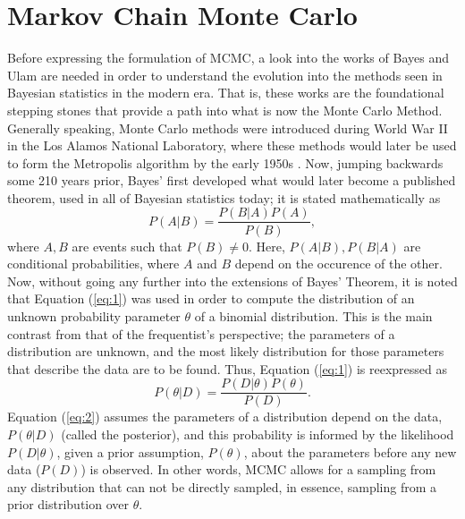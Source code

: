 \documentclass[11pt]{article}
\theoremstyle{definition}
\begin{document}
\section{Markov Chain Monte Carlo}
Before expressing the formulation of MCMC, a look into the works of Bayes and Ulam are needed in order to understand the evolution into the methods seen in Bayesian statistics in the modern era. That is, these works are the foundational stepping stones that provide a path into what is now the Monte Carlo Method. Generally speaking, Monte Carlo methods were introduced during World War II in the Los Alamos National Laboratory, where these methods would later be used to form the Metropolis algorithm by the early 1950s \cite{Robert_2011}. Now, jumping backwards some 210 years prior, Bayes' first developed what would later become a published theorem, used in all of Bayesian statistics today; it is stated mathematically as 
\begin{equation}\label{eq:1}
    P(A|B)=\frac{P(B|A)P(A)}{P(B)},
\end{equation}
where $A,B$ are events such that $P(B)\neq 0$. Here, $P(A|B),P(B|A)$ are conditional probabilities, where $A$ and $B$ depend on the occurence of the other. Now, without going any further into the extensions of Bayes' Theorem, it is noted that Equation (\ref{eq:1}) was used in order to compute the distribution of an unknown probability parameter $\theta$ of a binomial distribution. This is the main contrast from that of the frequentist's perspective; the parameters of a distribution are unknown, and the most likely distribution for those parameters that describe the data are to be found. Thus, Equation (\ref{eq:1}) is reexpressed as
\begin{equation}\label{eq:2}
    P(\theta|D)=\frac{P(D|\theta)P(\theta)}{P(D)}.
\end{equation}
Equation (\ref{eq:2}) assumes the parameters of a distribution depend on the data, $P(\theta|D)$ (called the posterior), and this probability is informed by the likelihood $P(D|\theta)$, given a prior assumption, $P(\theta)$, about the parameters before any new data ($P(D)$) is observed. In other words, MCMC allows for a sampling from any distribution that can not be directly sampled, in essence, sampling from a prior distribution over $\theta$.
\end{document}
